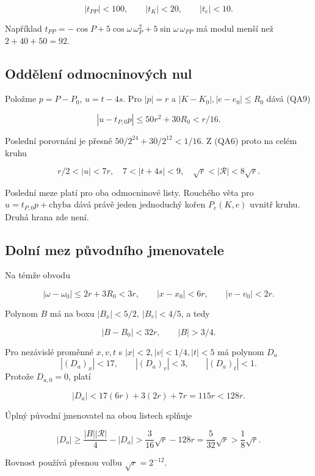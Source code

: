 \documentclass[11pt,a4paper]{article}
\theoremstyle{remark}\newtheorem{remark}[theorem]{Poznámka}
\numberwithin{equation}{section}
\begin{document}
\[
\boxed{|t_{PP}|<100,\qquad |t_K|<20,\qquad |t_e|<10.}
\tag{QA9}
\]

Například
\(t_{PP}=-\cos P+5\cos\omega\,\omega_P^2+ 5\sin\omega\,\omega_{PP}\) má
modul menší než \(2+40+50=92\).

\hypertarget{oddux11blenuxed-odmocninovuxfdch-nul}{%
\subsection{Oddělení odmocninových
nul}\label{oddux11blenuxed-odmocninovuxfdch-nul}}

Položme \(p=P-P_0\), \(u=t-4s\). Pro \(|p|=r\) a
\(|K-K_0|,|e-e_0|\le R_0\) dává (QA9)

\[
|u-t_{P,0}p|\le50r^2+30R_0<r/16.
\tag{QA10}
\]

Poslední porovnání je přesně \(50/2^{24}+30/2^{12}<1/16\). Z (QA6) proto
na celém kruhu

\[
\boxed{
r/2<|u|<7r,\quad 7<|t+4s|<9,\quad
\sqrt r<|\mathcal R|<8\sqrt r.
}
\tag{QA11}
\]

Poslední meze platí pro oba odmocninové listy. Rouchého věta pro
\(u=t_{P,0}p+\text{chyba}\) dává právě jeden jednoduchý kořen
\(P_e(K,e)\) uvnitř kruhu. Druhá hrana zde není.

\hypertarget{dolnuxed-mez-pux16fvodnuxedho-jmenovatele}{%
\subsection{Dolní mez původního
jmenovatele}\label{dolnuxed-mez-pux16fvodnuxedho-jmenovatele}}

Na témže obvodu

\[
|\omega-\omega_0|\le2r+3R_0<3r,\qquad
|x-x_0|<6r,\qquad |v-v_0|<2r.
\tag{QA12}
\]

Polynom \(B\) má na boxu \(|B_x|<5/2,\ |B_v|<4/5\), a tedy

\[
|B-B_0|<32r,\qquad \boxed{|B|>3/4.}
\tag{QA13}
\]

Pro nezávislé proměnné \(x,v,t\) s \(|x|<2,|v|<1/4,|t|<5\) má polynom
\(D_a\) \[
|(D_a)_x|<17,\qquad |(D_a)_v|<3,\qquad |(D_a)_t|<1.
\] Protože \(D_{a,0}=0\), platí

\[
\boxed{|D_a|<17(6r)+3(2r)+7r=115r<128r.}
\tag{QA14}
\]

Úplný původní jmenovatel na obou listech splňuje

\[
\boxed{
|D_o|\ge\frac{|B||\mathcal R|}{4}-|D_a|
>\frac3{16}\sqrt r-128r
=\frac5{32}\sqrt r>\frac18\sqrt r.
}
\tag{QA15}
\]

Rovnost používá přesnou volbu \(\sqrt r=2^{-12}\).
\end{document}
